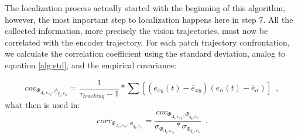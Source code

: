 %
The localization process actually started with the beginning of this algorithm, however, the most important step to localization happens here in step 7. All the collected information, more precisely the vision trajectories, must now be correlated with the encoder trajectory. For each patch trajectory confrontation, we calculate the correlation coefficient using the standard deviation, analog to equation \ref{alg:std}, and the empirical covariance:

\begin{equation}
\label{covariance}
	cov_{\Phi_{\Lambda_{i}, e_{xy}}, \phi_{q_{k}, e_{\alpha}}} = \frac{1}{\tau_{tracking}-1} * \sum \left[  \left(e_{xy}\left(t\right) - \overline{e}_{xy} \right) \left(e_{\alpha}\left(t\right) - \overline{e}_{\alpha}  \right) \right] \enspace ,
\end{equation}
what then is used in:
%
\begin{equation}
\label{correlation}
corr_{\Phi_{\Lambda_{i}, e_{xy}}, \phi_{q_{k}, e_{\alpha}}} = \frac{cov_{\Phi_{\Lambda_{i}, e_{xy}}, \Phi_{q_{k}, e_{\alpha}}}}{ \sigma_{\Phi_{\Lambda_{i}, e_{xy}}} * \sigma_{\Phi_{q_{k}, e_{\alpha}}}} \enspace .
\end{equation}

